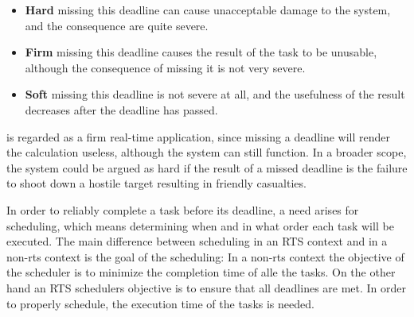 \begin{itemize}
  \item \textbf{Hard} missing this deadline can cause unacceptable damage to
  the system, and the consequence are quite severe.
  \item \textbf{Firm} missing this deadline causes the result of the task to
  be unusable, although the consequence of missing it is not very severe.
  \item \textbf{Soft} missing this deadline is not severe at all, and the
  usefulness of the result decreases after the deadline has passed.
\end{itemize}
\nl
\name is regarded as a firm real-time application, since missing a deadline will render the calculation useless, although the system can still function. In a broader scope, the system could be argued as hard if the result of a missed deadline is the failure to shoot down a hostile target resulting in friendly casualties. 

In order to reliably complete a task before its deadline, a need arises for
scheduling, which means determining when and in what order each task will be
executed. The main difference between scheduling in an RTS context and in a
non-rts context is the goal of the scheduling: In a non-rts context the
objective of the scheduler is to minimize the completion time of alle the tasks.
On the other hand an RTS schedulers objective is to ensure that all deadlines
are met. In order to properly schedule, the execution time of the tasks is
needed.

% 




